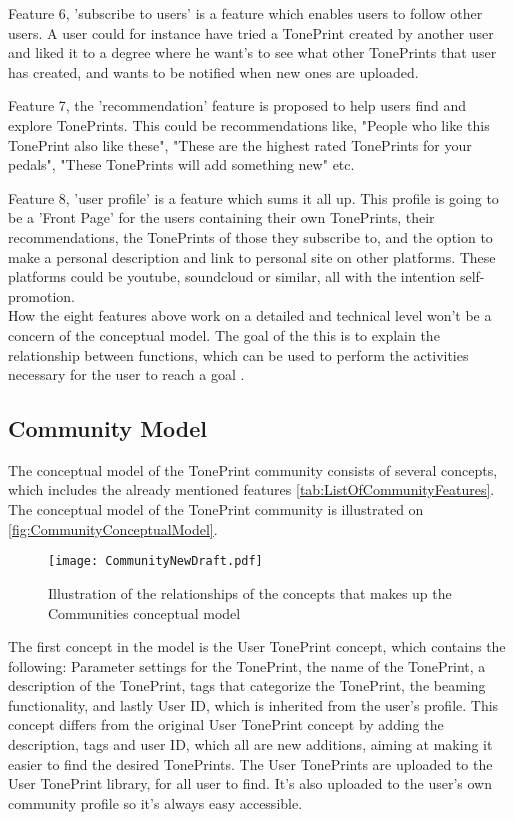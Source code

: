 Feature 6, 'subscribe to users' is a feature which enables users to follow other users. A user could for instance have tried a TonePrint created by another user and liked it to a degree where he want's to see what other TonePrints that user has created, and wants to be notified when new ones are uploaded.

Feature 7, the 'recommendation' feature is proposed to help users find and explore TonePrints. This could be recommendations like, "People who like this TonePrint also like these", "These are the highest rated TonePrints for your pedals", "These TonePrints will add something new" etc.

Feature 8, 'user profile' is a feature which sums it all up. This profile is going to be a 'Front Page' for the users containing their own TonePrints, their recommendations, the TonePrints of those they subscribe to, and the option to make a personal description and link to personal site on other platforms. These platforms could be youtube, soundcloud or similar, all with the intention self-promotion.\\

\noindent
How the eight features above work on a detailed and technical level won't be a concern of the conceptual model. The goal of the this is to explain the relationship between functions, which can be used to perform the activities necessary for the user to reach a goal \parencite{PDF:Henderson2012}.


\subsection{Community Model}
\label{CommunityModel}
The conceptual model of the TonePrint community consists of several concepts, which includes the already mentioned features \autoref{tab:ListOfCommunityFeatures}. The conceptual model of the TonePrint community is illustrated on \autoref{fig:CommunityConceptualModel}.\\

\begin{figure}[H]
	\centering
	\texttt{[image: CommunityNewDraft.pdf]}
	\caption{Illustration of the relationships of the concepts that makes up the Communities conceptual model}
	\label{fig:CommunityConceptualModel}
\end{figure}

\noindent
The first concept in the model is the User TonePrint concept, which contains the following: Parameter settings for the TonePrint, the name of the TonePrint, a description of the TonePrint, tags that categorize the TonePrint, the beaming functionality, and lastly User ID, which is inherited from the user's profile. This concept differs from the original User TonePrint concept by adding the description, tags and user ID, which all are new additions, aiming at making it easier to find the desired TonePrints. The User TonePrints are uploaded to the User TonePrint library, for all user to find. It's also uploaded to the user's own community profile so it's always easy accessible.\\

